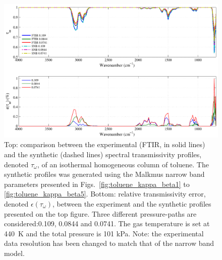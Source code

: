 \begin{figure}[p]
\includegraphics[width=\textwidth]{Figures/Comparison_Fit_Toluene_MALKMUS_Temp440K.pdf}
\caption{Top: comparison between the experimental (FTIR, in solid lines) and the synthetic (dashed lines) spectral transmissivity profiles, denoted $\tau_{\omega}$, of an isothermal homogeneous column of toluene. The synthetic profiles was generated using the Malkmus narrow band parameters presented in Figs.~\ref{fig:toluene_kappa_beta1} to \ref{fig:toluene_kappa_beta5}. Bottom: relative transmissivity error, denoted $\epsilon{(\tau_{\omega})}$, between the experiment and the synthetic profiles presented on the top figure. Three different pressure-paths are considered:0.109, 0.0844 and 0.0741. The gas temperature is set at 440~K and the total pressure is 101 kPa. Note: the experimental data resolution has been changed to match that of the narrow band model. \label{fig:toluene_SNBVerify_440K}}
\end{figure}

